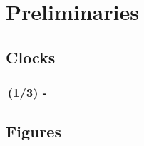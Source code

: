 \documentclass[./main]{subfiles}
\begin{document}
\setcounter{section}{1}
\section[Sec 2]{Preliminaries}




\subsection{Clocks}
\begin{frame}
  \frametitle{\secname\,(1/3) - \subsecname}

  \centering
  

\end{frame}

\subsection{Figures}
\end{document}
